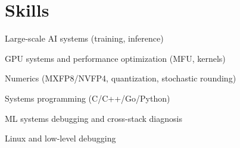 \documentclass[]{deedy-resume-openfont}
\begin{document}
\begin{minipage}[t]{0.30\textwidth}
\section{Skills}

\vspace{\topsep}

\begin{tightemize}
\item Large-scale AI systems (training, inference)
\item GPU systems and performance optimization (MFU, kernels)
\item Numerics (MXFP8/NVFP4, quantization, stochastic rounding)
\item Systems programming (C/C++/Go/Python)
\item ML systems debugging and cross-stack diagnosis
\item Linux and low-level debugging
\end{tightemize}

\end{minipage} 
\hfill
\end{document}
